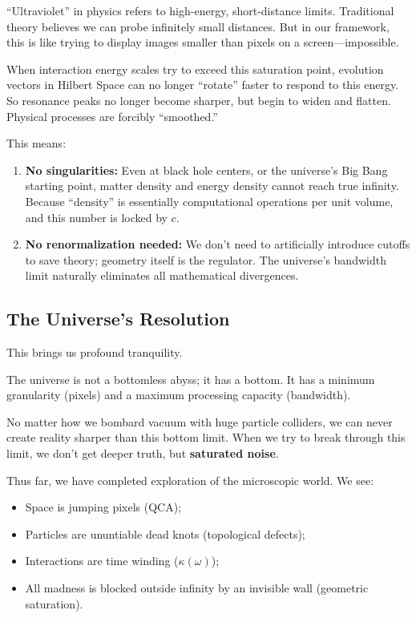 \documentclass[11pt,a4paper,twoside]{book}
\begin{document}
``Ultraviolet'' in physics refers to high-energy, short-distance limits. Traditional theory believes we can probe infinitely small distances. But in our framework, this is like trying to display images smaller than pixels on a screen---impossible.

When interaction energy scales try to exceed this saturation point, evolution vectors in Hilbert Space can no longer ``rotate'' faster to respond to this energy. So resonance peaks no longer become sharper, but begin to widen and flatten. Physical processes are forcibly ``smoothed.''

This means:

\begin{enumerate}
\item \textbf{No singularities:} Even at black hole centers, or the universe's Big Bang starting point, matter density and energy density cannot reach true infinity. Because ``density'' is essentially computational operations per unit volume, and this number is locked by $c$.

\item \textbf{No renormalization needed:} We don't need to artificially introduce cutoffs to save theory; geometry itself is the regulator. The universe's bandwidth limit naturally eliminates all mathematical divergences.
\end{enumerate}

\subsection{The Universe's Resolution}

This brings us profound tranquility.

The universe is not a bottomless abyss; it has a bottom. It has a minimum granularity (pixels) and a maximum processing capacity (bandwidth).

No matter how we bombard vacuum with huge particle colliders, we can never create reality sharper than this bottom limit. When we try to break through this limit, we don't get deeper truth, but \textbf{saturated noise}.

Thus far, we have completed exploration of the microscopic world. We see:

\begin{itemize}
\item Space is jumping pixels (QCA);

\item Particles are ununtiable dead knots (topological defects);

\item Interactions are time winding ($\kappa(\omega)$);

\item All madness is blocked outside infinity by an invisible wall (geometric saturation).
\end{itemize}
\end{document}
